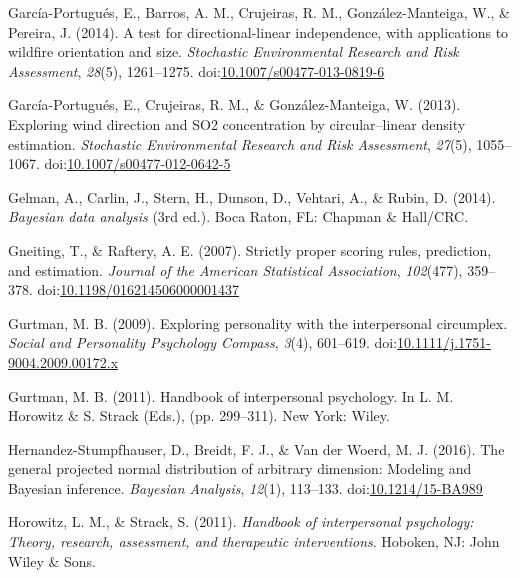 \documentclass[man,mask]{apa6}
\DeclareRobustCommand{\VANDER}[3]{#2}
\begin{document}
\leavevmode\hypertarget{ref-garcia2014test}{}%
García-Portugués, E., Barros, A. M., Crujeiras, R. M., González-Manteiga, W., \& Pereira, J. (2014). A test for directional-linear independence, with applications to wildfire orientation and size. \emph{Stochastic Environmental Research and Risk Assessment}, \emph{28}(5), 1261--1275. doi:\href{https://doi.org/10.1007/s00477-013-0819-6}{10.1007/s00477-013-0819-6}

\leavevmode\hypertarget{ref-garcia2013exploring}{}%
García-Portugués, E., Crujeiras, R. M., \& González-Manteiga, W. (2013). Exploring wind direction and SO2 concentration by circular--linear density estimation. \emph{Stochastic Environmental Research and Risk Assessment}, \emph{27}(5), 1055--1067. doi:\href{https://doi.org/10.1007/s00477-012-0642-5}{10.1007/s00477-012-0642-5}

\leavevmode\hypertarget{ref-BDA}{}%
Gelman, A., Carlin, J., Stern, H., Dunson, D., Vehtari, A., \& Rubin, D. (2014). \emph{Bayesian data analysis} (3rd ed.). Boca Raton, FL: Chapman \& Hall/CRC.

\leavevmode\hypertarget{ref-gneiting2007strictly}{}%
Gneiting, T., \& Raftery, A. E. (2007). Strictly proper scoring rules, prediction, and estimation. \emph{Journal of the American Statistical Association}, \emph{102}(477), 359--378. doi:\href{https://doi.org/10.1198/016214506000001437}{10.1198/016214506000001437}

\leavevmode\hypertarget{ref-gurtman2009exploring}{}%
Gurtman, M. B. (2009). Exploring personality with the interpersonal circumplex. \emph{Social and Personality Psychology Compass}, \emph{3}(4), 601--619. doi:\href{https://doi.org/10.1111/j.1751-9004.2009.00172.x}{10.1111/j.1751-9004.2009.00172.x}

\leavevmode\hypertarget{ref-gurtman2011reasoning}{}%
Gurtman, M. B. (2011). Handbook of interpersonal psychology. In L. M. Horowitz \& S. Strack (Eds.), (pp. 299--311). New York: Wiley.

\leavevmode\hypertarget{ref-hernandez2016general}{}%
Hernandez-Stumpfhauser, D., Breidt, F. J., \& \VANDER{Woerd}{Van der}{van der} Woerd, M. J. (2016). The general projected normal distribution of arbitrary dimension: Modeling and Bayesian inference. \emph{Bayesian Analysis}, \emph{12}(1), 113--133. doi:\href{https://doi.org/10.1214/15-BA989}{10.1214/15-BA989}

\leavevmode\hypertarget{ref-horowitz2010handbook}{}%
Horowitz, L. M., \& Strack, S. (2011). \emph{Handbook of interpersonal psychology: Theory, research, assessment, and therapeutic interventions}. Hoboken, NJ: John Wiley \& Sons.
\end{document}
